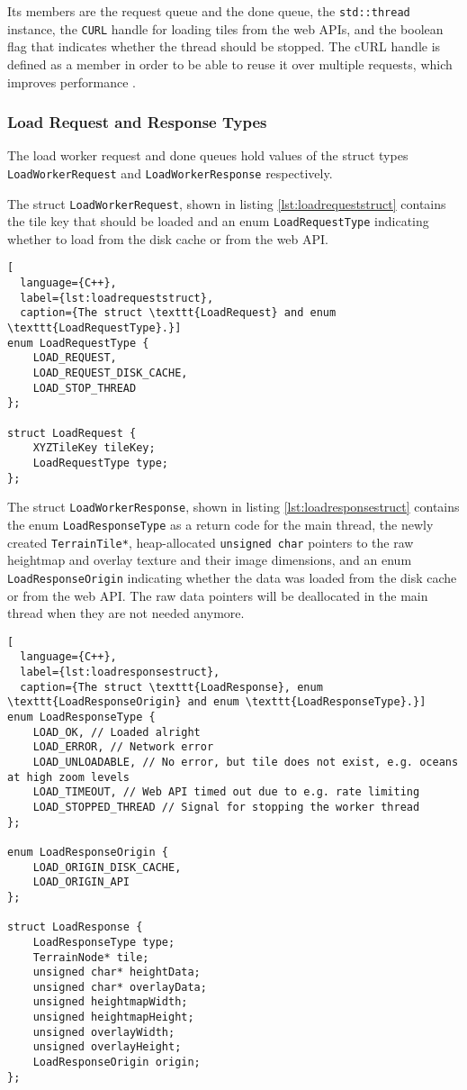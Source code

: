 Its members are the request queue and the done queue,
the \texttt{std::thread} instance,
the \texttt{CURL} handle for loading tiles from the web APIs,
and the boolean flag that indicates whether the thread 
should be stopped. The cURL handle is defined as a member 
in order to be able to reuse it over multiple requests, which improves 
performance \cite{curlhandlereuse}.

\subsubsection{Load Request and Response Types}
The load worker request and done queues hold values of the struct types \texttt{LoadWorkerRequest}
and \texttt{LoadWorkerResponse} respectively. 

The struct \texttt{LoadWorkerRequest},
shown in listing \ref{lst:loadrequeststruct}
contains the tile key that should be loaded and an enum \texttt{LoadRequestType}
indicating whether to load from the disk cache or from the web API.
\begin{lstlisting}[
  language={C++},
  label={lst:loadrequeststruct},
  caption={The struct \texttt{LoadRequest} and enum \texttt{LoadRequestType}.}]
enum LoadRequestType {
    LOAD_REQUEST,
    LOAD_REQUEST_DISK_CACHE,
    LOAD_STOP_THREAD
};

struct LoadRequest {
    XYZTileKey tileKey;
    LoadRequestType type;
};
\end{lstlisting}

The struct \texttt{LoadWorkerResponse},
shown in listing \ref{lst:loadresponsestruct}
contains the enum \texttt{LoadResponseType} as a return code 
for the main thread, the newly created \texttt{TerrainTile*},
heap-allocated \texttt{unsigned char} pointers to the raw heightmap and overlay texture
and their image dimensions,
and an enum \texttt{LoadResponseOrigin} indicating whether the data 
was loaded from the disk cache or from the web API.
The raw data pointers will be deallocated in the main 
thread when they are not needed anymore.

\begin{lstlisting}[
  language={C++},
  label={lst:loadresponsestruct},
  caption={The struct \texttt{LoadResponse}, enum \texttt{LoadResponseOrigin} and enum \texttt{LoadResponseType}.}]
enum LoadResponseType {
    LOAD_OK, // Loaded alright 
    LOAD_ERROR, // Network error
    LOAD_UNLOADABLE, // No error, but tile does not exist, e.g. oceans at high zoom levels
    LOAD_TIMEOUT, // Web API timed out due to e.g. rate limiting
    LOAD_STOPPED_THREAD // Signal for stopping the worker thread
};

enum LoadResponseOrigin {
    LOAD_ORIGIN_DISK_CACHE,
    LOAD_ORIGIN_API
};

struct LoadResponse {
    LoadResponseType type;
    TerrainNode* tile;
    unsigned char* heightData;
    unsigned char* overlayData;
    unsigned heightmapWidth;
    unsigned heightmapHeight;
    unsigned overlayWidth;
    unsigned overlayHeight;
    LoadResponseOrigin origin;
};
\end{lstlisting}

